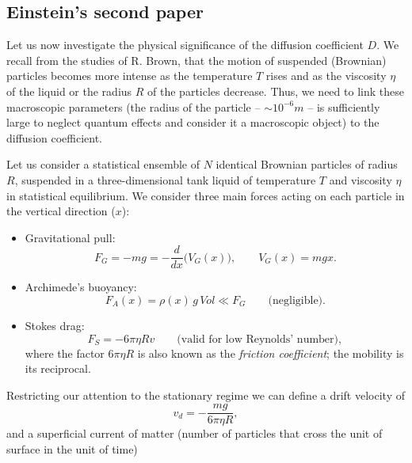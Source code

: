 \subsection{Einstein's second paper}

Let us now investigate the physical significance of the diffusion coefficient $D$.
We recall from the studies of R. Brown, that the motion of suspended (Brownian) particles becomes more intense as the temperature $T$ rises and as the viscosity $\eta$ of the liquid or the radius $R$ of the particles decrease.
Thus, we need to link these macroscopic parameters (the radius of the particle -- $\sim10^{-6}m$ -- is sufficiently large to neglect quantum effects and consider it a macroscopic object) to the diffusion coefficient.

Let us consider a statistical ensemble of $N$ identical Brownian particles of radius $R$, suspended in a three-dimensional tank liquid of temperature $T$ and viscosity $\eta$ in statistical equilibrium.
We consider three main forces acting on each particle in the vertical direction ($x$):
\begin{itemize}
	\item Gravitational pull:
	\begin{equation}
	F_G=-mg=-\frac{d}{dx}\bigl(V_G(x)\bigr), \qquad V_G(x)=mgx.
	\end{equation}
	\item Archimede's buoyancy:
	\begin{equation}
	F_A(x)=\rho(x)\, g\, Vol \ll F_G \qquad \text{(negligible)}.
	\end{equation}
	\item Stokes drag:
	\begin{equation}
	F_S=-6\pi\eta R v \qquad \text{(valid for low Reynolds' number)},
	\end{equation}
where the factor $6\pi\eta R$ is also known as the \emph{friction coefficient}; the mobility is its reciprocal.
\end{itemize}
Restricting our attention to the stationary regime we can define a drift velocity of
\begin{equation}
v_d=-\frac{mg}{6\pi \eta R},
\end{equation}
and a superficial current of matter (number of particles that cross the unit of surface in the unit of time)
